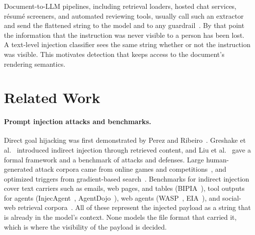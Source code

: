 Document-to-LLM pipelines, including retrieval loaders, hosted chat
services, résumé screeners, and automated reviewing tools, usually call such
an extractor and send the flattened string to the model and to any
guardrail~\cite{castagnaro2025hidden,liu2027what}. By that point the
information that the instruction was never visible to a person has been
lost. A text-level injection classifier sees the same string whether or not
the instruction was visible. This motivates detection that keeps access to
the document's rendering semantics.


\section{Related Work}
\label{sec:related}

\paragraph{Prompt injection attacks and benchmarks.}
Direct goal hijacking was first demonstrated by Perez and
Ribeiro~\cite{perez2022ignore}. Greshake et al.~\cite{greshake2023not}
introduced indirect injection through retrieved content, and Liu et
al.~\cite{liu2024formalizing} gave a formal framework and a benchmark of
attacks and defenses. Large human-generated attack corpora came from online
games and competitions~\cite{toyer2024tensor,schulhoff2023ignore}, and
optimized triggers from gradient-based search~\cite{pasquini2024neural}.
Benchmarks for indirect injection cover text carriers such as emails, web
pages, and tables (BIPIA~\cite{yi2025benchmarking}), tool outputs for agents
(InjecAgent~\cite{zhan2024injecagent},
AgentDojo~\cite{debenedetti2024agentdojo}), web agents
(WASP~\cite{evtimov2025wasp}, EIA~\cite{liao2025eia}), and social-web
retrieval corpora~\cite{guo2026hidden}. All of these represent the injected
payload as a string that is already in the model's context. None models the
file format that carried it, which is where the visibility of the payload is
decided.

